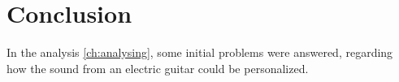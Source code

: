 \section{Conclusion}\label{sec:conclusion}

In the analysis \autoref{ch:analysing}, some initial problems were answered, regarding how the sound from an electric guitar could be personalized. 

